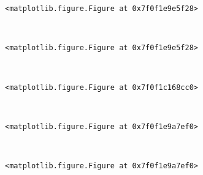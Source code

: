 \documentclass[11pt]{article}
\begin{document}
    
    \begin{verbatim}
<matplotlib.figure.Figure at 0x7f0f1e9e5f28>
    \end{verbatim}

    
    \begin{center}
    \end{center}
    { \hspace*{\fill} \\}
    
    
    \begin{verbatim}
<matplotlib.figure.Figure at 0x7f0f1e9e5f28>
    \end{verbatim}

    
    \begin{center}
    \end{center}
    { \hspace*{\fill} \\}
    
    
    \begin{verbatim}
<matplotlib.figure.Figure at 0x7f0f1c168cc0>
    \end{verbatim}

    
    \begin{center}
    \end{center}
    { \hspace*{\fill} \\}
    
    
    \begin{verbatim}
<matplotlib.figure.Figure at 0x7f0f1e9a7ef0>
    \end{verbatim}

    
    \begin{center}
    \end{center}
    { \hspace*{\fill} \\}
    
    
    \begin{verbatim}
<matplotlib.figure.Figure at 0x7f0f1e9a7ef0>
    \end{verbatim}

    
    \begin{center}
    \end{center}
    { \hspace*{\fill} \\}
    
\end{document}
